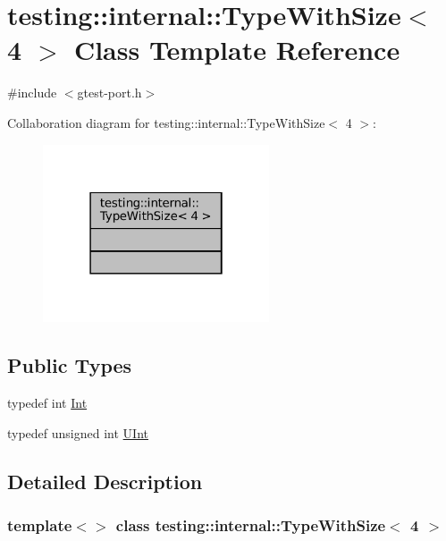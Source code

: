 \hypertarget{classtesting_1_1internal_1_1TypeWithSize_3_014_01_4}{}\section{testing\+:\+:internal\+:\+:Type\+With\+Size$<$ 4 $>$ Class Template Reference}
\label{classtesting_1_1internal_1_1TypeWithSize_3_014_01_4}


{\ttfamily \#include $<$gtest-\/port.\+h$>$}



Collaboration diagram for testing\+:\+:internal\+:\+:Type\+With\+Size$<$ 4 $>$\+:
\nopagebreak
\begin{figure}[H]
\begin{center}
\leavevmode
\includegraphics[width=190pt]{classtesting_1_1internal_1_1TypeWithSize_3_014_01_4__coll__graph}
\end{center}
\end{figure}
\subsection*{Public Types}
\begin{DoxyCompactItemize}
\item 
typedef int \hyperlink{classtesting_1_1internal_1_1TypeWithSize_3_014_01_4_a80351860c00ed665e73f952143f4484a}{Int}
\item 
typedef unsigned int \hyperlink{classtesting_1_1internal_1_1TypeWithSize_3_014_01_4_a7d559570f830bf35d095eeb94d98de58}{U\+Int}
\end{DoxyCompactItemize}


\subsection{Detailed Description}
\subsubsection*{template$<$$>$\newline
class testing\+::internal\+::\+Type\+With\+Size$<$ 4 $>$}



